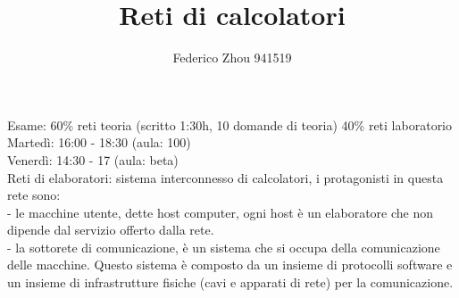 \documentclass[11pt, oneside]{article}   	%
\title{Reti di calcolatori}
\author{Federico Zhou 941519}
\date{}							%
\begin{document}
\maketitle
Esame: 60\% reti teoria (scritto 1:30h, 10 domande di teoria) 40\% reti laboratorio\\
Martedì: 16:00 - 18:30 (aula: 100)\\
Venerdì: 14:30 - 17 (aula: beta)\\

Reti di elaboratori: sistema interconnesso di calcolatori, i protagonisti in questa rete sono:\\
- le macchine utente, dette host computer, ogni host è un elaboratore che non dipende dal servizio offerto dalla rete.\\
- la sottorete di comunicazione, è un sistema che si occupa della comunicazione delle macchine. Questo sistema è composto da un insieme di protocolli software e un insieme di infrastrutture fisiche (cavi e apparati di rete) per la comunicazione.\\\\
\end{document}
